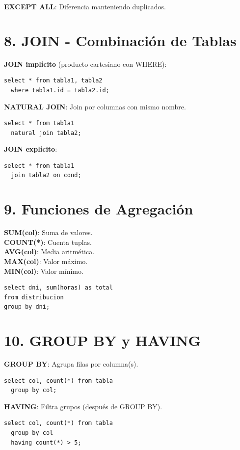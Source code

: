 \documentclass[10pt,a4paper,twocolumn]{article}
\begin{document}
\textbf{EXCEPT ALL}: Diferencia manteniendo duplicados.

\section*{8. JOIN - Combinación de Tablas}

\textbf{JOIN implícito} (producto cartesiano con WHERE):
\begin{lstlisting}
select * from tabla1, tabla2
  where tabla1.id = tabla2.id;
\end{lstlisting}

\textbf{NATURAL JOIN}: Join por columnas con mismo nombre.
\begin{lstlisting}
select * from tabla1 
  natural join tabla2;
\end{lstlisting}

\textbf{JOIN explícito}:
\begin{lstlisting}
select * from tabla1 
  join tabla2 on cond;
\end{lstlisting}

\section*{9. Funciones de Agregación}

\textbf{SUM(col)}: Suma de valores.\\
\textbf{COUNT(*)}: Cuenta tuplas.\\
\textbf{AVG(col)}: Media aritmética.\\
\textbf{MAX(col)}: Valor máximo.\\
\textbf{MIN(col)}: Valor mínimo.

\begin{lstlisting}
select dni, sum(horas) as total
from distribucion
group by dni;
\end{lstlisting}

\section*{10. GROUP BY y HAVING}

\textbf{GROUP BY}: Agrupa filas por columna(s).
\begin{lstlisting}
select col, count(*) from tabla
  group by col;
\end{lstlisting}

\textbf{HAVING}: Filtra grupos (después de GROUP BY).
\begin{lstlisting}
select col, count(*) from tabla
  group by col
  having count(*) > 5;
\end{lstlisting}
\end{document}
